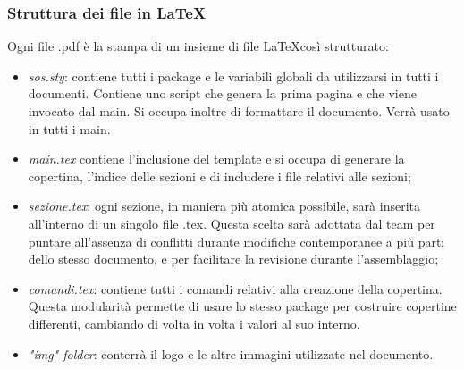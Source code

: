 	\subsubsection{Struttura dei file in \LaTeX}
	Ogni file .pdf è la stampa di un insieme di file \LaTeX così strutturato:
	\begin{itemize}
		\item \emph{sos.sty}: contiene tutti i package e le variabili globali da utilizzarsi in tutti i documenti. Contiene uno script che genera la prima pagina e che viene invocato dal main. Si occupa inoltre di formattare il documento. Verrà usato in tutti i main.
		\item \emph{main.tex} contiene l'inclusione del template e si occupa di generare la copertina, l'indice delle sezioni e di includere i file relativi alle sezioni;
		\item \emph{sezione.tex}: ogni sezione, in maniera più atomica possibile, sarà inserita all'interno di un singolo file .tex. Questa scelta sarà adottata dal team per puntare all'assenza di conflitti durante modifiche contemporanee a più parti dello stesso documento, e per facilitare la revisione durante l'assemblaggio;
		\item \emph{comandi.tex}: contiene tutti i comandi relativi alla creazione della copertina. Questa modularità permette di usare lo stesso package per costruire copertine differenti, cambiando di volta in volta i valori al suo interno.
		\item \emph{"img" folder}: conterrà il logo e le altre immagini utilizzate nel documento.
	\end{itemize}
